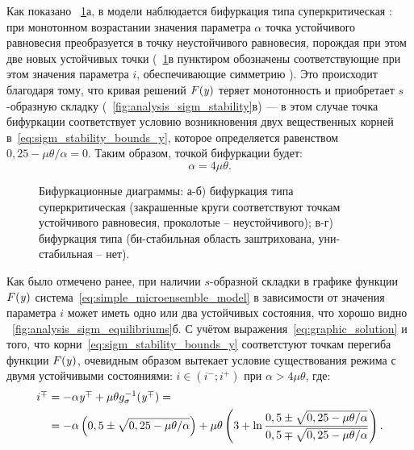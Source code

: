 Как показано \onfigure~\ref{fig:analysis_sigm_bifurcations}а, в модели наблюдается бифуркация типа суперкритическая : при монотонном возрастании значения параметра $\alpha$ точка устойчивого равновесия преобразуется в точку неустойчивого равновесия, порождая при этом две новых устойчивых точки (\onfigure~\ref{fig:analysis_sigm_bifurcations}в пунктиром обозначены соответствующие при этом значения параметра $i$, обеспечивающие симметрию ). Это происходит благодаря тому, что кривая решений $F(\mathit{y})$ теряет монотонность и приобретает $s$-образную складку (\seefigure~\ref{fig:analysis_sigm_stability}в) --- в этом случае точка бифуркации соответствует условию возникновения двух вещественных корней в~\eqref{eq:sigm_stability_bounds_y}, которое определяется равенством $0,25 - \mu \theta / \alpha = 0$. Таким образом, точкой бифуркации будет:
\begin{equation}
    \label{eq:sigm_bifurcation_alpha}
    \alpha =  4 \mu \theta.
\end{equation}

\begin{figure}[ht]
    \caption{Бифуркационные диаграммы: а-б) бифуркация типа суперкритическая  (закрашенные круги соответствуют точкам устойчивого равновесия, проколотые -- неустойчивого); в-г) бифуркация типа  (би-стабильная область заштрихована, уни-стабильная -- нет).}
    \label{fig:analysis_sigm_bifurcations}
\end{figure}

Как было отмечено ранее, при наличии $s$-образной складки в графике функции $F(\mathit{y})$ система~\eqref{eq:simple_microensemble_model} в зависимости от значения параметра $i$ может иметь одно или два устойчивых состояния, что хорошо видно \onfigure~\ref{fig:analysis_sigm_equilibriums}б. С учётом выражения~\eqref{eq:graphic_solution} и того, что корни~\eqref{eq:sigm_stability_bounds_y} соответстуют точкам перегиба функции $F(\mathit{y})$, очевидным образом вытекает условие существования режима с двумя устойчивыми состояниями: $i \in \left(i^{-}; i^{+}\right)$ при $\alpha > 4 \mu \theta$, где:
\begin{equation}
    \label{eq:sigm_stability_bounds_i}
    \begin{alignedat}{2}
        i^{\mp} &= -\alpha \mathit{y}^{\mp} + \mu \theta g_{\sigma}^{-1}(\mathit{y}^{\mp}) = \\
                &= -\alpha \left(0,5 \pm \sqrt{0,25 - \mu \theta / \alpha}\right) + \mu \theta \left(3 + \ln\dfrac{0,5 \pm \sqrt{0,25 - \mu \theta / \alpha}}{0,5 \mp \sqrt{0,25 - \mu \theta / \alpha}}\right).
    \end{alignedat}
\end{equation}

